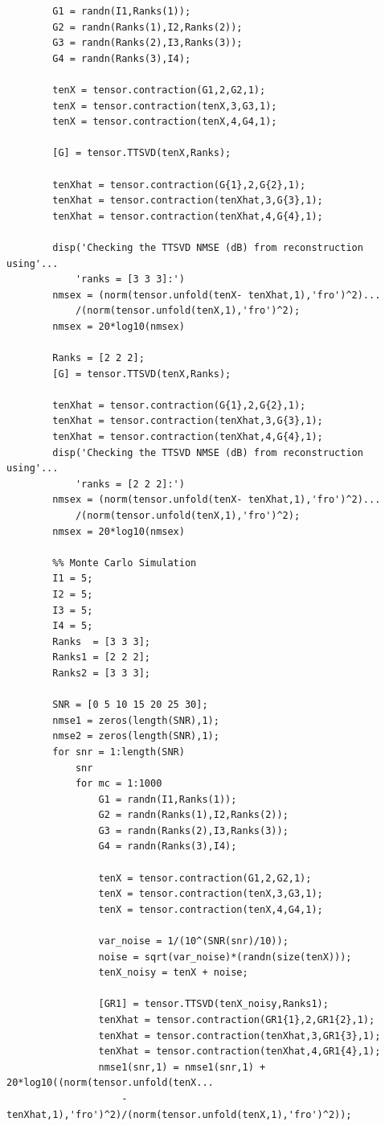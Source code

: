 \documentclass[a4paper,10pt]{article}
\begin{document}
\begin{verbatim}
        G1 = randn(I1,Ranks(1));
        G2 = randn(Ranks(1),I2,Ranks(2));
        G3 = randn(Ranks(2),I3,Ranks(3));
        G4 = randn(Ranks(3),I4);

        tenX = tensor.contraction(G1,2,G2,1);
        tenX = tensor.contraction(tenX,3,G3,1);
        tenX = tensor.contraction(tenX,4,G4,1);

        [G] = tensor.TTSVD(tenX,Ranks);

        tenXhat = tensor.contraction(G{1},2,G{2},1);
        tenXhat = tensor.contraction(tenXhat,3,G{3},1);
        tenXhat = tensor.contraction(tenXhat,4,G{4},1);

        disp('Checking the TTSVD NMSE (dB) from reconstruction using'... 
            'ranks = [3 3 3]:')
        nmsex = (norm(tensor.unfold(tenX- tenXhat,1),'fro')^2)...
            /(norm(tensor.unfold(tenX,1),'fro')^2);
        nmsex = 20*log10(nmsex)

        Ranks = [2 2 2];
        [G] = tensor.TTSVD(tenX,Ranks);

        tenXhat = tensor.contraction(G{1},2,G{2},1);
        tenXhat = tensor.contraction(tenXhat,3,G{3},1);
        tenXhat = tensor.contraction(tenXhat,4,G{4},1);
        disp('Checking the TTSVD NMSE (dB) from reconstruction using'... 
            'ranks = [2 2 2]:')
        nmsex = (norm(tensor.unfold(tenX- tenXhat,1),'fro')^2)...
            /(norm(tensor.unfold(tenX,1),'fro')^2);
        nmsex = 20*log10(nmsex)

        %% Monte Carlo Simulation
        I1 = 5;
        I2 = 5;
        I3 = 5;
        I4 = 5;
        Ranks  = [3 3 3];
        Ranks1 = [2 2 2];
        Ranks2 = [3 3 3];

        SNR = [0 5 10 15 20 25 30];
        nmse1 = zeros(length(SNR),1);
        nmse2 = zeros(length(SNR),1);
        for snr = 1:length(SNR)
            snr
            for mc = 1:1000
                G1 = randn(I1,Ranks(1));
                G2 = randn(Ranks(1),I2,Ranks(2));
                G3 = randn(Ranks(2),I3,Ranks(3));
                G4 = randn(Ranks(3),I4);

                tenX = tensor.contraction(G1,2,G2,1);
                tenX = tensor.contraction(tenX,3,G3,1);
                tenX = tensor.contraction(tenX,4,G4,1);

                var_noise = 1/(10^(SNR(snr)/10));
                noise = sqrt(var_noise)*(randn(size(tenX)));
                tenX_noisy = tenX + noise;
                
                [GR1] = tensor.TTSVD(tenX_noisy,Ranks1);
                tenXhat = tensor.contraction(GR1{1},2,GR1{2},1);
                tenXhat = tensor.contraction(tenXhat,3,GR1{3},1);
                tenXhat = tensor.contraction(tenXhat,4,GR1{4},1);
                nmse1(snr,1) = nmse1(snr,1) + 20*log10((norm(tensor.unfold(tenX...
                    - tenXhat,1),'fro')^2)/(norm(tensor.unfold(tenX,1),'fro')^2));
                

\end{verbatim}
\end{document}
